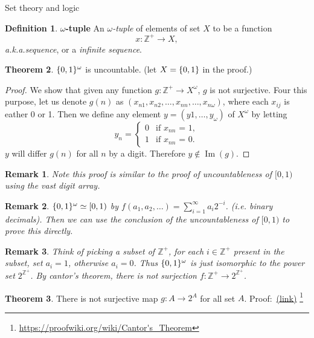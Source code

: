 \documentclass{report}
\newcommand*{\link}[1]{\href{#1}{(\underline{link})}%
  \footnote{\url{#1}}}
\newtheorem*{remark}{Remark}
\theoremstyle{definition}
\newtheorem{theorem}{Theorem}[chapter]
\newtheorem{definition}[theorem]{Definition}
\newcommand{\set}[1]{\ensuremath\{#1\}}
\newcommand{\ie}{\textit{i.e.}\xspace}
\newcommand{\aka}{\textit{a.k.a.}\xspace}
\newcommand{\ZZ}{\mathbb{Z}}
\begin{document}
\begin{chapter}{Set theory and logic}
  \begin{definition}{\textbf{$\omega$-tuple}}
    An \emph{$\omega$-tuple} of elements of set $X$ to be a function
    $$x:\ZZ^+\to X,$$
    \aka \emph{sequence}, or a \emph{infinite sequence}.
  \end{definition}

  \begin{theorem}
    $\set{0,1}^\omega$ is uncountable. (let $X=\set{0,1}$ in the proof.)
  \end{theorem}
  \begin{proof}
    We show that given any function $g:\ZZ^+\to X^\omega$, $g$ is not
    surjective. Four this purpose, let us denote $g(n)$ as
    $(x_{n1},x_{n2},\ldots,x_{nn},\ldots,x_{n\omega})$, where each $x_{ij}$ is
    eather 0 or 1. Then we define any element $y=(y1,\ldots,y_\omega)$
    of $X^\omega$ by letting
    \begin{equation*}
      y_n=
      \begin{cases}
        0 & \text{if $x_{nn}$ = 1}, \\
        1 & \text{if $x_{nn}$ = 0}.
      \end{cases}
    \end{equation*}
    $y$ will differ $g(n)$ for all $n$ by a digit. Therefore
    $y\not\in \operatorname{Im}(g)$.
  \end{proof}
  \begin{remark}
    Note this proof is similar to the proof of uncountableness of
    $[0,1)$ using the vast digit array.
  \end{remark}
  \begin{remark}
    $\set{0,1}^\omega
    \simeq [0,1)$ by $f(a_1,a_2,\ldots)=\sum_{i=1}^\infty{a_i
      2^{-i}}$. (\ie binary decimals). Then we can use the conclusion
    of the uncountableness of $[0,1)$ to prove this directly.
  \end{remark}
  \begin{remark}
    Think of picking a subset of $\ZZ^+$, for each $i\in\ZZ^+$ present in
    the subset, set $a_i=1$, otherwise $a_i=0$. Thus
    $\set{0,1}^\omega$ is just isomorphic to the power set
    $2^{\ZZ^+}$. By cantor's theorem, there is not surjection
    $f : \ZZ^+\to 2^{\ZZ^+}$.
  \end{remark}

  \begin{theorem}
    There is not surjective map $g:A\to 2^A$ for all set $A$. Proof:~\link{https://proofwiki.org/wiki/Cantor's_Theorem}
  \end{theorem}



\end{chapter}
\end{document}
